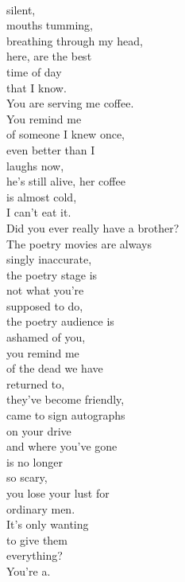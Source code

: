 \documentclass[smalldemyvopaper,11pt,twoside,onecolumn,openright,extrafontsizes]{memoir}
\begin{document}
\\silent,
\\mouths tumming,
\\breathing through my head,
\\here, are the best
\\time of day
\\that I know.
\\You are serving me coffee.
\\You remind me
\\of someone I knew once,
\\even better than I
\\laughs now,
\\he's still alive, her coffee
\\is almost cold,
\\I can't eat it.
\\Did you ever really have a brother?
\\The poetry movies are always
\\singly inaccurate,
\\the poetry stage is
\\not what you're
\\supposed to do,
\\the poetry audience is
\\ashamed of you,
\\you remind me
\\of the dead we have
\\returned to,
\\they've become friendly,
\\came to sign autographs
\\on your drive
\\and where you've gone
\\is no longer
\\so scary,
\\you lose your lust for
\\ordinary men.
\\It's only wanting
\\to give them
\\everything?
\\You're a.
\end{document}
